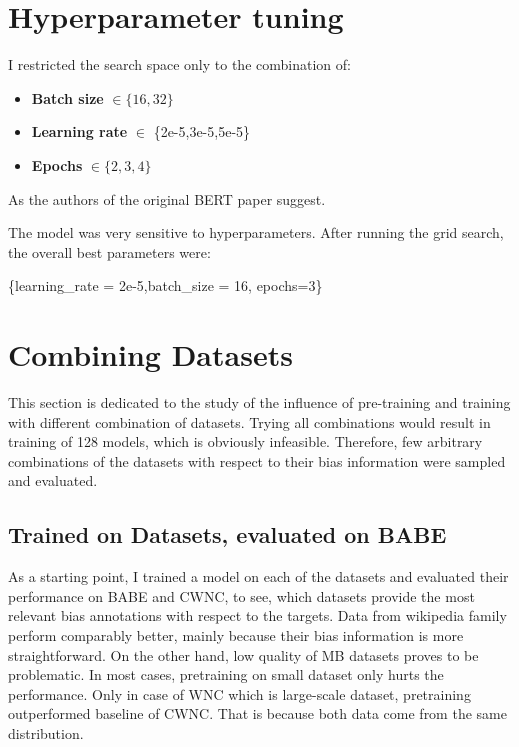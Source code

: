  
 

 
 
 
 
 
 \section{Hyperparameter tuning}
I restricted the search space only to the combination of:
 \begin{itemize}
     \item \textbf{Batch size} $\in \{16,32\}$
     \item \textbf{Learning rate} $\in $ \{2e-5,3e-5,5e-5\}
     \item \textbf{Epochs} $\in \{2,3,4\}$
 \end{itemize}
 
 As the authors of the original BERT paper suggest. 
 
 The model was very sensitive to hyperparameters. After running the grid search, the overall best parameters were:
 \begin{center}
      \{learning\_rate = 2e-5,batch\_size = 16, epochs=3\}
 \end{center}


 
 
 
 \section{Combining Datasets}
This section is dedicated to the study of the influence of pre-training and training with different combination of datasets. Trying all combinations would result in training of 128 models, which is obviously infeasible. Therefore, few arbitrary combinations of the datasets with respect to their bias information were sampled and evaluated.
 
 
 
 
 
 \subsection{Trained on Datasets, evaluated on BABE}
 As a starting point, I trained a model on each of the datasets and evaluated their performance on BABE and CWNC, to see, which datasets provide the most relevant bias annotations with respect to the targets. Data from wikipedia family perform comparably better, mainly because their bias information is more straightforward. On the other hand, low quality of MB datasets proves to be problematic. In most cases, pretraining on small dataset only hurts the performance. Only in case of WNC which is large-scale dataset, pretraining outperformed baseline of CWNC. That is because both data come from the same distribution.
 
